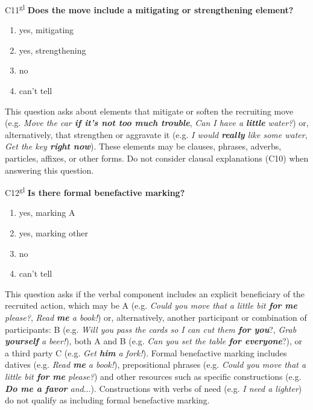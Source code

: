 \documentclass[output=paper]{langsci/langscibook}
\begin{document}
\begin{description}
\item
C11\textsuperscript{gl}  \textbf{Does the move include a mitigating or strengthening element?}

\renewcommand{\theenumi}{\arabic{enumi}}
\begin{enumerate}
\item {yes, mitigating}
\item {yes, strengthening}
\item {no}
\item {can’t tell}
\end{enumerate}

This question asks about elements that mitigate or soften the recruiting move (e.g. \textit{Move the car \textbf{if it’s not too much trouble}}, \textit{Can I have a \textbf{little} water?}) or, alternatively, that strengthen or aggravate it (e.g. \textit{I would \textbf{really} like some water}, \textit{Get the key \textbf{right now}}). These elements may be clauses, phrases, adverbs, particles, affixes, or other forms. Do not consider clausal explanations (C10) when answering this question.

\item
C12\textsuperscript{gl}  \textbf{Is there formal benefactive marking?}

\begin{enumerate}
\item {yes, marking A}
\item {yes, marking other}
\item {no}
\item {can't tell}
\end{enumerate}

This question asks if the verbal component includes an explicit beneficiary of the recruited action, which may be A (e.g. \textit{Could you move that a little bit \textbf{for me} please?}, \textit{Read \textbf{me} a book!}) or, alternatively, another participant or combination of participants: B (e.g. \textit{Will you pass the cards so I can cut them \textbf{for you}}?, \textit{Grab \textbf{yourself} a beer!}), both A and B (e.g. \textit{Can you set the table \textbf{for everyone}}?), or a third party C (e.g. \textit{Get \textbf{him} a fork!}). Formal benefactive marking includes datives (e.g. \textit{Read \textbf{me} a book!}), prepositional phrases (e.g. \textit{Could you move that a little bit \textbf{for me} please?}) and other resources such as specific constructions (e.g. \textit{\textbf{Do me a favor} and}...). Constructions with verbs of need (e.g. \textit{I need a lighter}) do not qualify as including formal benefactive marking.


\end{description}
\end{document}
